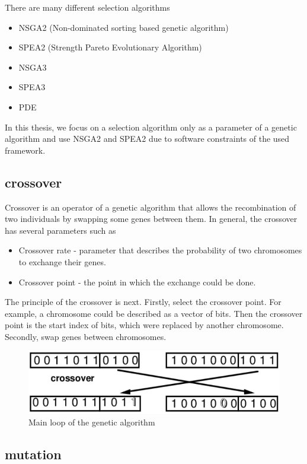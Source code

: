 There are many different selection algorithms
\begin{itemize}
	\item NSGA2 (Non-dominated sorting based genetic algorithm)
	\item SPEA2 (Strength Pareto Evolutionary Algorithm)
	\item NSGA3
	\item SPEA3
	\item PDE 
\end{itemize}
In this thesis, we focus on a selection algorithm only as a parameter of a genetic algorithm and use NSGA2 and SPEA2 due to software constraints of the used framework. 
\subsection{crossover}
Crossover is an operator of a genetic algorithm that allows the recombination of two individuals by swapping some genes between them.
In general, the crossover has several parameters such as
\begin{itemize}
	\item Crossover rate - parameter that describes the probability of two chromosomes to exchange their genes.
	\item Crossover point - the point in which the exchange could be done.
\end{itemize}

The principle of the crossover is next.
Firstly, select the crossover point. For example, a chromosome could be described as a vector of bits. Then the crossover point is the start index of bits, which were replaced by another chromosome.
Secondly, swap genes between chromosomes.

\begin{figure}
	\centering
	\includegraphics[width=\textwidth]{images/crossoverVector.png}
	\caption{Main loop of the genetic algorithm}
	\label{fig:crossoverVector}
\end{figure}

\subsection{mutation}

